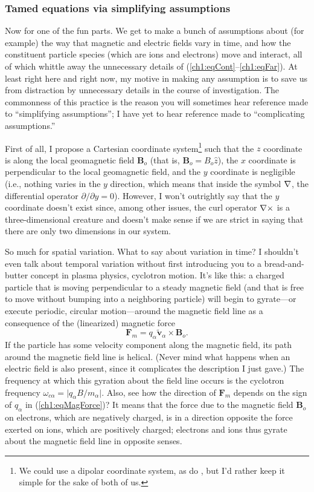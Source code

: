 \subsubsection{Tamed equations via simplifying assumptions} \label{ch1:sssAssume}

Now for one of the fun parts. We get to make a bunch of assumptions about (for
example) the way that magnetic and electric fields vary in time, and how the
constituent particle species (which are ions and electrons) move and interact,
all of which whittle away the unnecessary details of
(\ref{ch1:eqCont}--\ref{ch1:eqFar}). At least right here and right now, my
motive in making any assumption is to save us from distraction by unnecessary
details in the course of investigation. The commonness of this practice is the
reason you will sometimes hear reference made to ``simplifying assumptions''; I
have yet to hear reference made to ``complicating assumptions.''

First of all, I propose a Cartesian coordinate system\footnote{We could use a
  dipolar coordinate system, as do \citet{Lysak2013}, but I'd rather keep it
  simple for the sake of both of us.} such that the $z$ coordinate is along the
local geomagnetic field $\mathbf{B}_o$ (that is, $\mathbf{B}_o = B_o \hat{z}$),
the $x$ coordinate is perpendicular to the local geomagnetic field, and the $y$
coordinate is negligible (i.e., nothing varies in the $y$ direction, which means
that inside the symbol ${\bf \nabla}$, the differential operator $\partial / \partial y
= 0$). However, I won't outrightly say that the $y$ coordinate doesn't exist
since, among other issues, the curl operator ${\bf \nabla} \times$ is a
three-dimensional creature and doesn't make sense if we are strict in saying
that there are only two dimensions in our system.

So much for spatial variation. What to say about variation in time? I shouldn't
even talk about temporal variation without first introducing you to a
bread-and-butter concept in plasma physics, cyclotron motion. It's like this: a
charged particle that is moving perpendicular to a steady magnetic field (and
that is free to move without bumping into a neighboring particle) will begin to
gyrate---or execute periodic, circular motion---around the magnetic field line
as a consequence of the (linearized) magnetic force
\begin{equation} \label{ch1:eqMagForce} 
\mathbf{F}_m = q_\alpha \mathbf{\tilde v}_\alpha \times \mathbf{B}_o.
\end{equation} 
If the particle has some velocity component along the magnetic field, its path
around the magnetic field line is helical. (Never mind what happens when an
electric field is also present, since it complicates the description I just
gave.) The frequency at which this gyration about the field line occurs is the
cyclotron frequency $\omega_{c \alpha} = \vert q_\alpha B /m_\alpha \vert$.
Also, see how the direction of $\mathbf{F}_m$ depends on the sign of $q_\alpha$
in (\ref{ch1:eqMagForce})? It means that the force due to the magnetic field
$\mathbf{B}_o$ on electrons, which are negatively charged, is in a direction
opposite the force exerted on ions, which are positively charged; electrons and
ions thus gyrate about the magnetic field line in opposite senses.

